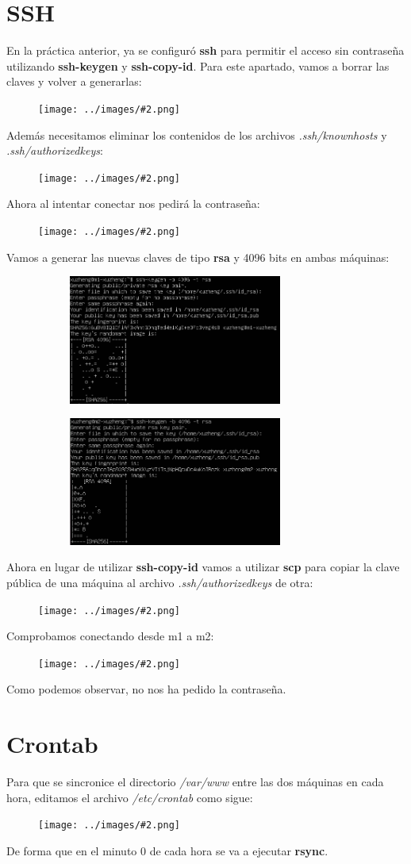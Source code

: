 \documentclass[twoside]{article}
\newcommand{\image}[2]{
\begin{figure}[H]
    \texttt{[image: ../images/\#2.png]}
    \centering
\end{figure}
}
\begin{document}
\section{SSH}
En la práctica anterior, ya se configuró \textbf{ssh} para permitir el acceso sin contraseña utilizando \textbf{ssh-keygen} y \textbf{ssh-copy-id}. Para este apartado, vamos a borrar las claves y volver a generarlas:
\image{6}{12}
Además necesitamos eliminar los contenidos de los archivos \textit{.ssh/known\textunderscore hosts} y \textit{.ssh/authorized\textunderscore keys}:
\image{6}{16}
Ahora al intentar conectar nos pedirá la contraseña:
\image{8}{17}
Vamos a generar las nuevas claves de tipo \textbf{rsa} y 4096 bits en ambas máquinas:
\begin{figure}[H]
    \centering
    \begin{subfigure}{.5\textwidth}
        \centering
        \includegraphics[width=7cm]{../images/13.png}
    \end{subfigure}%
    \begin{subfigure}{.5\textwidth}
        \centering
        \includegraphics[width=7cm]{../images/14.png}
    \end{subfigure}
\end{figure}
Ahora en lugar de utilizar \textbf{ssh-copy-id} vamos a utilizar \textbf{scp} para copiar la clave pública de una máquina al archivo \textit{.ssh/authorized\textunderscore keys} de otra:
\image{8}{18}
Comprobamos conectando desde m1 a m2:
\image{8}{19}
Como podemos observar, no nos ha pedido la contraseña.

\section{Crontab}
Para que se sincronice el directorio \textit{/var/www} entre las dos máquinas en cada hora,  editamos el archivo \textit{/etc/crontab} como sigue:
\image{8}{20}
De forma que en el minuto 0 de cada hora se va a ejecutar \textbf{rsync}.
\end{document}

